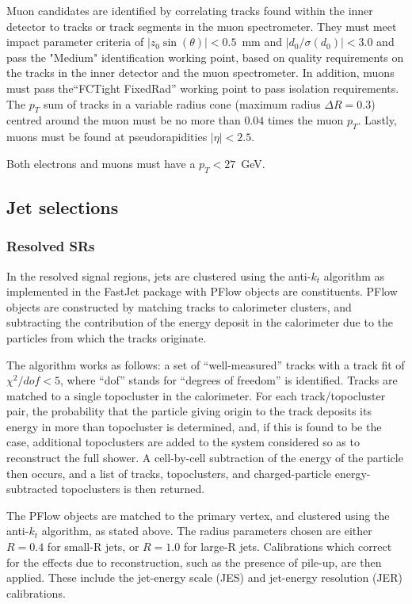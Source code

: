 \documentclass[10pt,a4paper]{book}
\begin{document}
Muon candidates are identified by correlating tracks found within the inner detector to tracks or track segments in the muon spectrometer. They must meet impact parameter criteria of $\vert z_0\sin(\theta)\vert  < 0.5$~mm and $\vert d_0/\sigma(d_0)\vert < 3.0$ and pass the "Medium" identification working point, based on quality requirements on the tracks in the inner detector and the muon spectrometer. In addition, muons must pass the``FCTight FixedRad” working point to pass isolation requirements. The $p_T$ sum of tracks in a variable radius cone (maximum radius $\Delta R = 0.3$) centred around the muon must be no more than $0.04$ times the muon $p_T$. Lastly, muons must be found at pseudorapidities $\vert \eta \vert < 2.5$. 

Both electrons and muons must have a $p_T < 27$~GeV.

\subsection{Jet selections}

\subsubsection{Resolved SRs}
In the resolved signal regions, jets are clustered using the anti-$k_t$ algorithm as implemented in the FastJet package with PFlow objects are constituents. PFlow objects are constructed by matching tracks to calorimeter clusters, and subtracting the contribution of the energy deposit in the calorimeter due to the particles from which the tracks originate. 

The algorithm works as follows: a set of ``well-measured'' tracks with  a track fit of $\chi^2/dof < 5$, where ``dof'' stands for ``degrees of freedom'' is identified. Tracks are matched to a single topocluster in the calorimeter. For each track/topocluster pair, the probability that the particle giving origin to the track deposits its energy in more than topocluster is determined, and, if this is found to be the case, additional topoclusters are added to the system considered so as to reconstruct the full shower. A cell-by-cell subtraction of the energy of the particle then occurs, and a list of tracks, topoclusters, and charged-particle energy-subtracted topoclusters is then returned. 

The PFlow objects are matched to the primary vertex, and clustered using the anti-$k_t$ algorithm, as stated above. The radius parameters chosen are either $R = 0.4$ for small-R jets, or $R = 1.0$ for large-R jets. Calibrations which correct for the effects due to reconstruction, such as the presence of pile-up, are then applied. These include the jet-energy scale (JES) and jet-energy resolution (JER) calibrations.
\end{document}
